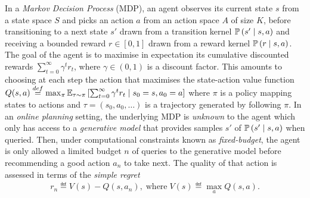 \documentclass[runningheads]{llncs}
\begin{document}
In a \emph{Markov Decision Process} (MDP), an agent observes its current state $s$ from a state space $S$ and picks an action $a$ from an action space $A$ of size $K$, before transitioning to a next state $s'$ drawn from a transition kernel $\mathbb{P}\left(s'\;\middle|\; s,a\right)$ and receiving a bounded reward $r\in[0, 1]$ drawn from a reward kernel $\mathbb{P}\left(r \;\middle|\; s, a\right)$.
The goal of the agent is to maximise in expectation its cumulative discounted rewards $\sum_{t=0}^\infty \gamma^t r_t$, where $\gamma\in(0, 1)$ is a discount factor. This amounts to choosing at each step the action that maximises the state-action value function %
$
Q(s, a) \stackrel{def}{=} \max_\pi  \operatorname*{\mathbb{E}}_{\tau\sim\pi} \left[\sum_{t=0}^\infty \gamma^t r_t\;\middle|\; s_0 = s, a_0 = a\right]
$
where $\pi$ is a policy mapping states to actions and $\tau = (s_0, a_0, \dots)$ is a trajectory generated by following $\pi$. In an \emph{online planning} setting, the underlying MDP is \emph{unknown} to the agent which only has access to a \emph{generative model} that provides samples $s'$ of $\mathbb{P}\left(s' \;\middle|\; s, a\right)$ when queried. Then, under computational constraints known as \emph{fixed-budget}, the agent is only allowed a limited budget $n$ of queries to the generative model before recommending a good action $a_n$ to take next.
The quality of that action is assessed in terms of the \emph{simple regret}
\begin{align}
	r_n \eqdef V(s) - Q(s, {a}_n), \; \mbox{where} \; V(s) \eqdef  \max_a Q(s, a).
\end{align}
\end{document}
